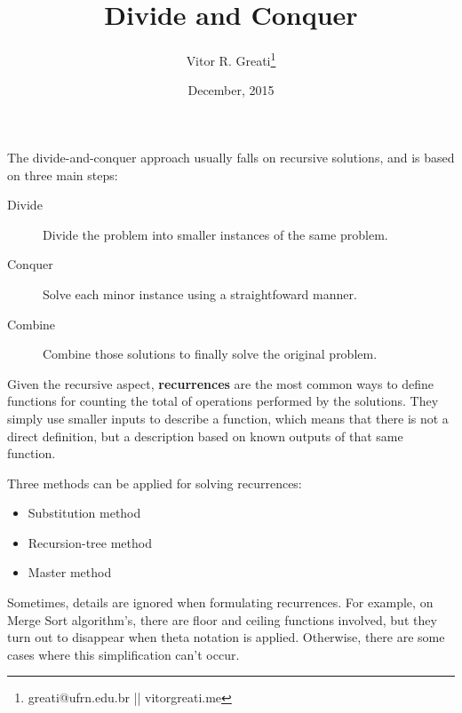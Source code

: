 \documentclass{article}
\begin{document}
\title{Divide and Conquer}
\author{Vitor R. Greati\thanks{greati@ufrn.edu.br || vitorgreati.me}}
\date{December, 2015}

\maketitle

The divide-and-conquer approach usually falls on recursive solutions, and is based on three main
steps:
\begin{description}
	\item[Divide] Divide the problem into smaller instances of the same problem.
	\item[Conquer] Solve each minor instance using a straightfoward manner.
	\item[Combine] Combine those solutions to finally solve the original problem.
\end{description}

Given the recursive aspect, \textbf{recurrences} are the most common ways to define functions for
counting the total of operations performed by the solutions. They simply use smaller inputs to describe
a function, which means that there is not a direct definition, but a description based on known outputs
of that same function.

Three methods can be applied for solving recurrences:
\begin{itemize}
	\item{Substitution method}
	\item{Recursion-tree method}
	\item{Master method}
\end{itemize}

Sometimes, details are ignored when formulating recurrences. For example, on Merge Sort algorithm's,
there are floor and ceiling functions involved, but they turn out to disappear when theta notation
is applied. Otherwise, there are some cases where this simplification can't occur.
\end{document}
